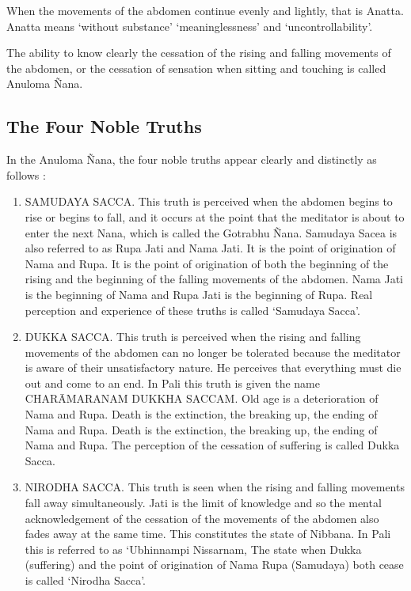 \documentclass[a5paper,10pt,english]{book}
\begin{document}
\sphinxAtStartPar
When the movements of the abdomen continue evenly and lightly, that is Anatta. Anatta means ‘without substance’ ‘meaninglessness’ and ‘uncontrollability’.

\sphinxAtStartPar
The ability to know clearly the cessation of the rising and falling movements of the abdomen, or the cessation of sensation when sitting and touching is called Anuloma Ñana.


\subsection{The Four Noble Truths}
\label{\detokenize{progress:the-four-noble-truths}}
\sphinxAtStartPar
In the Anuloma Ñana, the four noble truths appear clearly and distinctly as follows :\sphinxhyphen{}
\begin{enumerate}
%
\item {} 
\sphinxAtStartPar
SAMUDAYA SACCA. This truth is perceived when the abdomen begins to rise or begins to fall, and it occurs at the point that the meditator is about to enter the next Nana, which is called the Gotrabhu Ñana. Samudaya Sacea is also referred to as Rupa Jati and Nama Jati. It is the point of origination of Nama and Rupa. It is the point of origination of both the beginning of the rising and the beginning of the falling movements of the abdomen. Nama Jati is the beginning of Nama and Rupa Jati is the beginning of Rupa. Real perception and experience of these truths is called ‘Samudaya Sacca’.

\item {} 
\sphinxAtStartPar
DUKKA SACCA. This truth is perceived when the rising and falling movements of the abdomen can no longer be tolerated because the meditator is aware of their unsatisfactory nature. He perceives that everything must die out and come to an end. In Pali this truth is given the name CHARĀMARANAM DUKKHA SACCAM. Old age is a deterioration of Nama and Rupa. Death is the extinction, the breaking up, the ending of Nama and Rupa. Death is the extinction, the breaking up, the ending of Nama and Rupa. The perception of the cessation of suffering is called Dukka Sacca.

\item {} 
\sphinxAtStartPar
NIRODHA SACCA. This truth is seen when the rising and falling movements fall away simultaneously. Jati is the limit of knowledge and so the mental acknowledgement of the cessation of the movements of the abdomen also fades away at the same time. This constitutes the state of Nibbana. In Pali this is referred to as ‘Ubhinnampi Nissarnam, The state when Dukka (suffering) and the point of origination of Nama Rupa (Samudaya) both cease is called ‘Nirodha Sacca’.


\end{enumerate}
\end{document}

